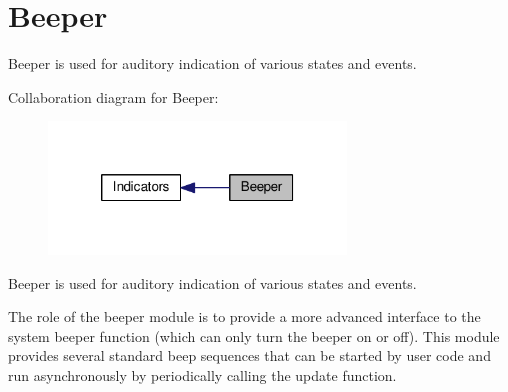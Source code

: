 \hypertarget{group__BEEPER}{\section{Beeper}
\label{group__BEEPER}
}


Beeper is used for auditory indication of various states and events.  


Collaboration diagram for Beeper\+:\nopagebreak
\begin{figure}[H]
\begin{center}
\leavevmode
\includegraphics[width=224pt]{group__BEEPER}
\end{center}
\end{figure}
Beeper is used for auditory indication of various states and events. 

The role of the beeper module is to provide a more advanced interface to the system beeper function (which can only turn the beeper on or off). This module provides several standard beep sequences that can be started by user code and run asynchronously by periodically calling the update function. 